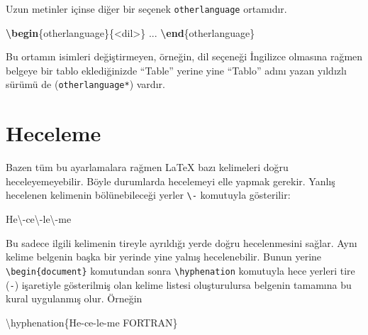 \documentclass[
  10pt,
]{scrbook}
\newenvironment{Shaded}{\begin{snugshade}}{\end{snugshade}}
\newcommand{\ExtensionTok}[1]{#1}
\newcommand{\FunctionTok}[1]{\textcolor[rgb]{0.00,0.00,0.00}{#1}}
\newcommand{\KeywordTok}[1]{\textcolor[rgb]{0.13,0.29,0.53}{\textbf{#1}}}
\newcommand{\NormalTok}[1]{#1}
\theoremstyle{definition}
\theoremstyle{definition}
\theoremstyle{definition}
\theoremstyle{definition}
\theoremstyle{remark}
\begin{document}
Uzun metinler içinse diğer bir seçenek \texttt{otherlanguage} ortamıdır.

\begin{Shaded}
\begin{Highlighting}[]
\KeywordTok{\textbackslash{}begin}\NormalTok{\{}\ExtensionTok{otherlanguage}\NormalTok{\}\{\textless{}dil\textgreater{}\}}
\NormalTok{  ...}
\KeywordTok{\textbackslash{}end}\NormalTok{\{}\ExtensionTok{otherlanguage}\NormalTok{\}}
\end{Highlighting}
\end{Shaded}

Bu ortamın isimleri değiştirmeyen, örneğin, dil seçeneği İngilizce olmasına rağmen belgeye bir tablo eklediğinizde ``Table'' yerine yine ``Tablo'' adını yazan yıldızlı sürümü de (\texttt{otherlanguage*}) vardır.

\hypertarget{heceleme}{%
\section{Heceleme}\label{heceleme}}

Bazen tüm bu ayarlamalara rağmen LaTeX bazı kelimeleri doğru heceleyemeyebilir. Böyle durumlarda hecelemeyi elle yapmak gerekir. Yanlış hecelenen kelimenin bölünebileceği yerler \texttt{\textbackslash{}-} komutuyla gösterilir:

\begin{Shaded}
\begin{Highlighting}[]
\NormalTok{He}\FunctionTok{\textbackslash{}{-}}\NormalTok{ce}\FunctionTok{\textbackslash{}{-}}\NormalTok{le}\FunctionTok{\textbackslash{}{-}}\NormalTok{me}
\end{Highlighting}
\end{Shaded}

Bu sadece ilgili kelimenin tireyle ayrıldığı yerde doğru hecelenmesini sağlar. Aynı kelime belgenin başka bir yerinde yine yalnış hecelenebilir. Bunun yerine \texttt{\textbackslash{}begin\{document\}} komutundan sonra \texttt{\textbackslash{}hyphenation} komutuyla hece yerleri tire (\texttt{-}) işaretiyle gösterilmiş olan kelime listesi oluşturulursa belgenin tamamına bu kural uygulanmış olur. Örneğin

\begin{Shaded}
\begin{Highlighting}[]
\FunctionTok{\textbackslash{}hyphenation}\NormalTok{\{He{-}ce{-}le{-}me FORTRAN\}}
\end{Highlighting}
\end{Shaded}
\end{document}
